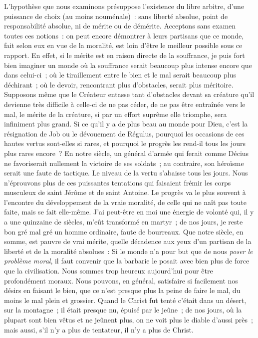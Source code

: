\documentclass[french,twoside]{book} %
\begin{document}
L’hypothèse que nous examinons présuppose l’existence du libre arbitre, d’une puissance de choix (au moins nouménale) : sans liberté absolue, point de responsabilité absolue, ni de mérite ou de démérite. Acceptons sans examen toutes ces notions : on peut encore démontrer à leurs partisans que ce monde, fait selon eux en vue de la moralité, est loin d’être le meilleur possible sous ce rapport. En effet, si le mérite est en raison directe de la souffrance, je puis fort bien imaginer un monde où la souffrance serait beaucoup plus intense encore que dans celui-ci ; où le tiraillement entre le bien et le mal serait beaucoup plus déchirant ; où le devoir, rencontrant plus d’obstacles, serait plus méritoire. Supposons même que le Créateur entasse tant d’obstacles devant sa créature qu’il devienne très difficile à celle-ci de ne pas céder, de ne pas être entraînée vers le mal, le mérite de la créature, si par un effort suprême elle triomphe, sera infiniment plus grand. Si ce qu’il y a de plus beau au monde pour Dieu, c’est la résignation de Job ou le dévouement de Régulus, pourquoi les occasions de ces hautes vertus sont-elles si rares, et pourquoi le progrès les rend-il tous les jours plus rares encore ? En notre siècle, un général d’armée qui ferait comme Décius ne favoriserait nullement la victoire de ses soldats ; au contraire, son héroïsme serait une faute de tactique. Le niveau de la vertu s’abaisse tous les jours. Nous n’éprouvons plus de ces puissantes tentations qui faisaient frémir les corps musculeux de saint Jérôme et de saint Antoine. Le progrès va le plus souvent à l’encontre du développement de la vraie moralité, de celle qui ne naît pas toute faite, mais se fait elle-même. J’ai peut-être en moi une énergie de volonté qui, il y a une quinzaine de siècles, m’eût transformé en martyr ; de nos jours, je reste bon gré mal gré un homme ordinaire, faute de bourreaux. Que notre siècle, en somme, est pauvre de vrai mérite, quelle décadence aux yeux d’un partisan de la liberté et de la moralité absolues : Si le monde n’a pour but que de nous \emph{poser le problème moral}, il faut convenir que la barbarie le posait avec bien plus de force que la civilisation. Nous sommes trop heureux aujourd’hui pour être profondément moraux. Nous pouvons, en général, satisfaire si facilement nos désirs en faisant le bien, que ce n’est presque plus la peine de faire le mal, du moins le mal plein et grossier. Quand le Christ fut tenté c’était dans un désert, sur la montagne ; il était presque nu, épuisé par le jeûne ; de nos jours, où la plupart sont bien vêtus et ne jeûnent plus, on ne voit plus le diable d’aussi près ; mais aussi, s’il n’y a plus de tentateur, il n’y a plus de Christ.\par
\end{document}
